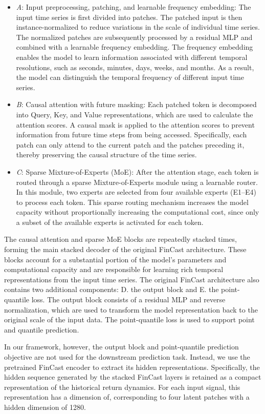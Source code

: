 \documentclass[pdflatex,sn-mathphys-num]{sn-jnl}%
\theoremstyle{thmstyleone}%
\theoremstyle{thmstyletwo}%
\theoremstyle{thmstylethree}%
\begin{document}
\begin{itemize}
\item \textit{A}: Input preprocessing, patching, and learnable frequency embedding:
The input time series is first divided into patches. The patched input is then instance-normalized to reduce variations in the scale of individual time series. The normalized patches are subsequently processed by a residual MLP and combined with a learnable frequency embedding. The frequency embedding enables the model to learn information associated with different temporal resolutions, such as seconds, minutes, days, weeks, and months. As a result, the model can distinguish the temporal frequency of different input time series.
\item \textit{B}: Causal attention with future masking: Each patched token is decomposed into Query, Key, and Value representations, which are used to calculate the attention scores. A causal mask is applied to the attention scores to prevent information from future time steps from being accessed. Specifically, each patch can only attend to the current patch and the patches preceding it, thereby preserving the causal structure of the time series.
\item \textit{C}: Sparse Mixture-of-Experts (MoE): After the attention stage, each token is routed through a sparse Mixture-of-Experts module using a learnable router. In this module, two experts are selected from four available experts (E1–E4) to process each token. This sparse routing mechanism increases the model capacity without proportionally increasing the computational cost, since only a subset of the available experts is activated for each token.
\end{itemize}

The causal attention and sparse MoE blocks are repeatedly stacked times, forming the main stacked decoder of the original FinCast architecture. These blocks account for a substantial portion of the model's parameters and computational capacity and are responsible for learning rich temporal representations from the input time series.
The original FinCast architecture also contains two additional components: D. the output block and E. the point-quantile loss. The output block consists of a residual MLP and reverse normalization, which are used to transform the model representation back to the original scale of the input data. The point-quantile loss is used to support point and quantile prediction.

In our framework, however, the output block and point-quantile prediction objective are not used for the downstream prediction task. Instead, we use the pretrained FinCast encoder to extract its hidden representations. Specifically, the hidden sequence generated by the stacked FinCast layers is retained as a compact representation of the historical return dynamics. For each input signal, this representation has a dimension of, corresponding to four latent patches with a hidden dimension of 1280.
\end{document}
